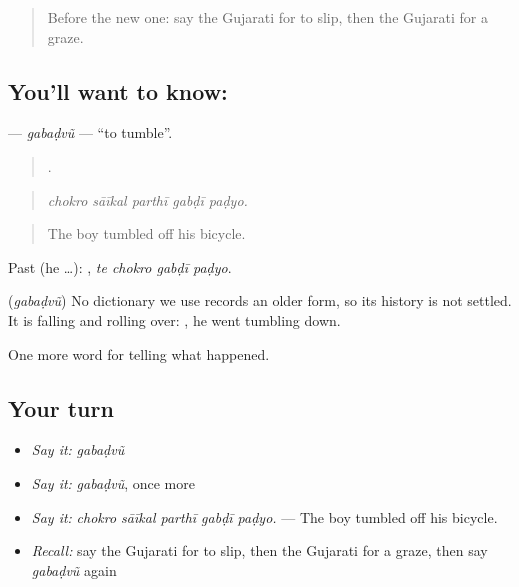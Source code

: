 \label{lesson:GU-C294-gabadvu}



\begin{quote}
Before the new one: say the Gujarati for to slip, then the Gujarati for a graze.
\end{quote}

\subsection*{You'll want to know: }
\textbf{} — \emph{gabaḍvũ} — \textquotedblleft{}to tumble\textquotedblright{}.

\begin{quote}
    .
\end{quote}

\begin{quote}
\emph{chokro sāīkal parthī gabḍī paḍyo.}
\end{quote}

\begin{quote}
The boy tumbled off his bicycle.
\end{quote}

Past (he …):    , \emph{te chokro gabḍī paḍyo}.

\begin{cousinweb}
\textbf{} (\emph{gabaḍvũ}) No dictionary we use records an older form, so its history is not settled. It is falling and rolling over: \textbf{ }, he went tumbling down.
\end{cousinweb}

\begin{grammarlens}[title={What you've built}]
One more word for telling what happened.
\end{grammarlens}

\subsection*{Your turn}
\begin{itemize}
\raggedright
  \item \emph{Say it:} \emph{gabaḍvũ}
  \item \emph{Say it:} \emph{gabaḍvũ}, once more
  \item \emph{Say it:} \emph{chokro sāīkal parthī gabḍī paḍyo.} — The boy tumbled off his bicycle.
  \item \emph{Recall:} say the Gujarati for to slip, then the Gujarati for a graze, then say \emph{gabaḍvũ} again
\end{itemize}

